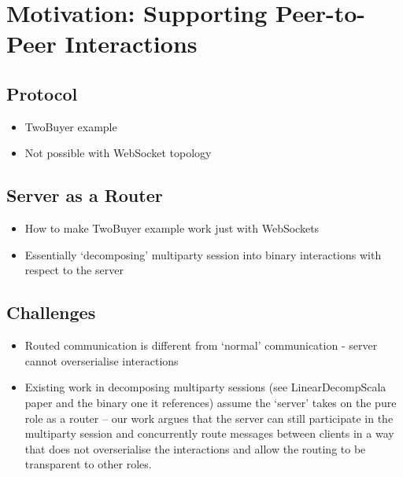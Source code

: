 \chapter{Motivation: Supporting Peer-to-Peer Interactions}

\section{ Protocol}
\begin{itemize}
\item TwoBuyer example
\item Not possible with WebSocket topology
\end{itemize}

\section{Server as a Router}
\begin{itemize}
\item How to make TwoBuyer example work just with WebSockets
\item Essentially `decomposing' multiparty session into binary interactions with respect to the server
\end{itemize}

\section{Challenges}
\begin{itemize}
\item Routed communication is different from `normal' communication
- server cannot overserialise interactions
\item Existing work in decomposing multiparty sessions (see LinearDecompScala paper and the binary one it references) assume the `server' takes on the pure role as a router -- our work argues that the server can still participate in the multiparty session and concurrently route messages between clients in a way that does not overserialise the interactions and allow the routing to be transparent to other roles.
\end{itemize}